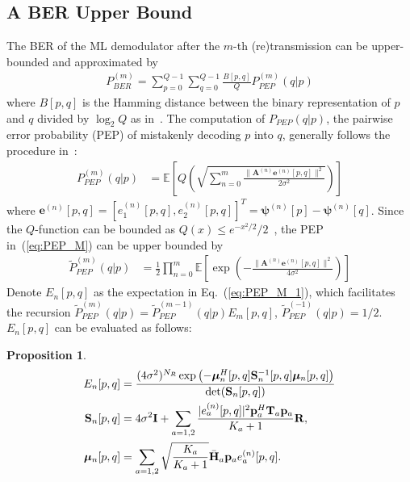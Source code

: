 \documentclass[journal]{IEEEtran}
\newtheorem{proposition}{Proposition}
\begin{document}
\subsection{A BER Upper Bound}
\label{ssec:ber}
The BER of the ML demodulator after the $m$-th (re)transmission can be
upper-bounded and approximated by
\begin{align}
  P_{BER}^{(m)} = \sum_{p=0}^{Q - 1}\sum_{q=0}^{Q - 1}\frac{B[p,
  q]}{Q}P_{PEP}^{(m)}(q|p) \label{eq:P_BER}
\end{align}
where $B[p, q]$ is the Hamming distance between the binary
representation of $p$ and $q$ divided by $\log_2Q$ as
in~\cite{samra2005symbol}. The computation of $P_{PEP}(q|p)$, the pairwise
error probability (PEP) of mistakenly decoding $p$ into $q$, generally follows
the procedure in~\cite{han2009performance}:
\begin{align}
    P_{PEP}^{(m)}(q|p) & = \mathbb{E}
    \left[Q\left(\sqrt{\sum_{n=0}^m\frac{\|\mathbf{A}^{(n)}
    \mathbf{e}^{(n)}[p,q]\|^2} {2\sigma^2}}\right)\right]
    \label{eq:PEP_M}
\end{align}
where $\mathbf{e}^{(n)}[p,q] = [e_1^{(n)}[p,q], e_2^{(n)}[p,q]]^T =
\bm{\psi}^{(n)}[p] - \bm{\psi}^{(n)}[q]$.
Since the $Q$-function can be bounded as $Q(x)\leq e^{-x^2/2}/2$~\cite{proakisdigital},
the PEP in~(\ref{eq:PEP_M}) can be upper bounded by
\begin{align}
    \tilde{P}_{PEP}^{(m)}(q|p) & =
    \frac{1}{2} \prod_{n=0}^{m}
    \mathbb{E}\left[\exp\left(-\frac{\|\mathbf{A}^{(n)}
    \mathbf{e}^{(n)}[p,q]\|^2}{4\sigma^2}\right)\right]
    \label{eq:PEP_M_1}
\end{align}
Denote $E_n[p,q]$ as the expectation in Eq.~(\ref{eq:PEP_M_1}), which
facilitates the recursion $\tilde{P}_{PEP}^{(m)}(q|p) =
\tilde{P}_{PEP}^{(m-1)}(q|p)E_m[p,q]$, $\tilde{P}_{PEP}^{(-1)}(q|p)=1/2$.
$E_n[p,q]$ can be evaluated as follows:
\begin{proposition}
  \begin{align}
    E_n[p,q] & =
    \frac{(4\sigma^2)^{N_R}\exp\left(-\bm{\mu}_n^H[p,q]\mathbf{S}_n^{-1}[p,q]\bm{\mu}_n[p,q]\right)}
    {\det(\mathbf{S}_n[p,q])} \label{eq:E}\\
     \mathbf{S}_n[p,q] & =
    4\sigma^2\mathbf{I} +
    \sum_{a=1,2} \frac{|e_a^{(n)}[p,q]|^2 \mathbf{p}_a^H\mathbf{T}_a
    \mathbf{p}_a}{K_a+1} \mathbf{R},\notag\\
    \bm{\mu}_n[p,q] & = \sum_{a=1,2}
    \sqrt{\frac{K_a}{K_a+1}}\bar{\mathbf{H}}_a\mathbf{p}_ae_a^{(n)}[p,q].
    \label{eq:S_mu}
  \end{align}
  \label{prop:en}
\end{proposition}
\end{document}
